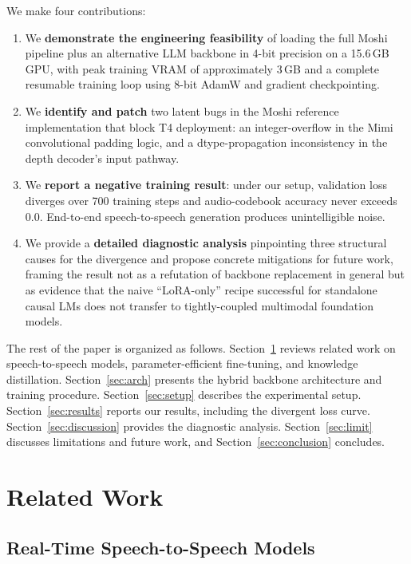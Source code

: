 \documentclass[conference]{IEEEtran}
\begin{document}
We make four contributions:

\begin{enumerate}
    \item We \textbf{demonstrate the engineering feasibility} of loading the full Moshi pipeline plus an alternative LLM backbone in 4-bit precision on a 15.6\,GB GPU, with peak training VRAM of approximately $3$\,GB and a complete resumable training loop using 8-bit AdamW \cite{bitsandbytes2022} and gradient checkpointing.
    \item We \textbf{identify and patch} two latent bugs in the Moshi reference implementation that block T4 deployment: an integer-overflow in the Mimi convolutional padding logic, and a dtype-propagation inconsistency in the depth decoder's input pathway.
    \item We \textbf{report a negative training result}: under our setup, validation loss diverges over 700 training steps and audio-codebook accuracy never exceeds $0.0$. End-to-end speech-to-speech generation produces unintelligible noise.
    \item We provide a \textbf{detailed diagnostic analysis} pinpointing three structural causes for the divergence and propose concrete mitigations for future work, framing the result not as a refutation of backbone replacement in general but as evidence that the naive ``LoRA-only'' recipe successful for standalone causal LMs does not transfer to tightly-coupled multimodal foundation models.
\end{enumerate}

The rest of the paper is organized as follows. Section~\ref{sec:related} reviews related work on speech-to-speech models, parameter-efficient fine-tuning, and knowledge distillation. Section~\ref{sec:arch} presents the hybrid backbone architecture and training procedure. Section~\ref{sec:setup} describes the experimental setup. Section~\ref{sec:results} reports our results, including the divergent loss curve. Section~\ref{sec:discussion} provides the diagnostic analysis. Section~\ref{sec:limit} discusses limitations and future work, and Section~\ref{sec:conclusion} concludes.

\section{Related Work}
\label{sec:related}

\subsection{Real-Time Speech-to-Speech Models}
\end{document}
